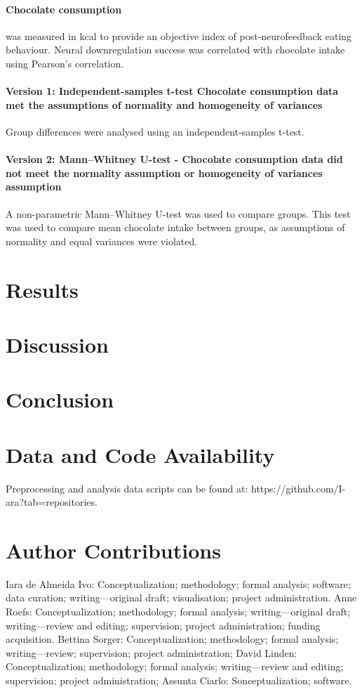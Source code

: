 \documentclass[]{imag-ms-template}
\begin{document}
\paragraph {Chocolate consumption} was measured in kcal to provide an objective index of post-neurofeedback eating behaviour. Neural downregulation success was correlated with chocolate intake using Pearson’s correlation.
\paragraph{Version 1: Independent-samples t-test Chocolate consumption data met the assumptions of normality and homogeneity of variances} Group differences were analysed using an independent-samples t-test. 
\paragraph{Version 2: Mann–Whitney U-test - Chocolate consumption data did not meet the normality assumption or homogeneity of variances assumption}A non-parametric Mann–Whitney U-test was used to compare groups. This test was used to compare mean chocolate intake between groups, as assumptions of normality and equal variances were violated.

\section{Results}

\section{Discussion}

\section{Conclusion}

\section*{Data and Code Availability}

Preprocessing and analysis data scripts can be found at: https://github.com/I-ara?tab=repositories.

\section*{Author Contributions}

Iara de Almeida Ivo: Conceptualization; methodology; formal analysis; software; data curation; writing—original draft; visualisation; project administration.
Anne Roefs: Conceptualization; methodology; formal analysis; writing—original draft; writing—review and editing; supervision; project administration; funding acquisition. 
Bettina Sorger: Conceptualization; methodology; formal analysis; writing—review; supervision; project administration;
David Linden: Conceptualization; methodology; formal analysis; writing—review and editing; supervision; project administration;
Assunta Ciarlo: Sonceptualization; software.
\end{document}
